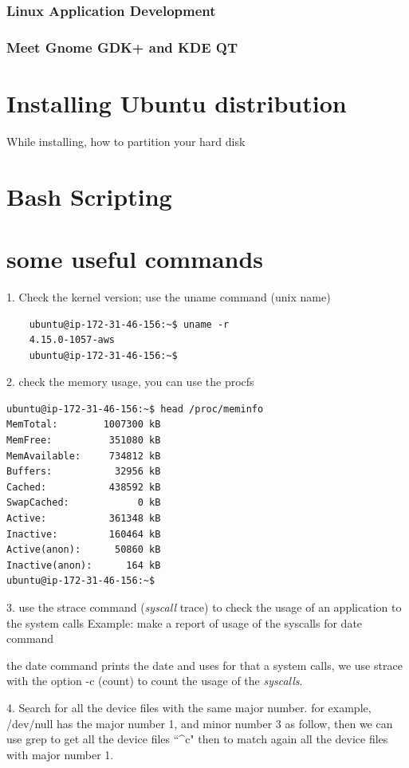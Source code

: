 \documentclass{article}
\begin{document}
\subsubsection{Linux Application Development}

\subsubsection{Meet Gnome GDK+ and KDE QT}

\section{Installing Ubuntu distribution}
While installing, how to partition your hard disk

\section{Bash Scripting}


\section{some useful commands}
1. Check the kernel version; use the uname command (unix name)
\begin{lstlisting}
    ubuntu@ip-172-31-46-156:~$ uname -r
    4.15.0-1057-aws
    ubuntu@ip-172-31-46-156:~$    
\end{lstlisting}

2. check the memory usage, you can use the procfs
\begin{lstlisting}
ubuntu@ip-172-31-46-156:~$ head /proc/meminfo
MemTotal:        1007300 kB
MemFree:          351080 kB
MemAvailable:     734812 kB
Buffers:           32956 kB
Cached:           438592 kB
SwapCached:            0 kB
Active:           361348 kB
Inactive:         160464 kB
Active(anon):      50860 kB
Inactive(anon):      164 kB
ubuntu@ip-172-31-46-156:~$
\end{lstlisting}

3. use the strace command (\textit{syscall} trace) to check the usage of an application to the system calls
Example: make a report of usage of the syscalls for date command 


the date command prints the date and uses for that a system calls, we use strace with the option -c (count) to count the usage of the \textit{syscalls}.

4. Search for all the device files with the same major number.
for example, /dev/null has the major number 1, and minor number 3 as follow, then we can use grep to get all the device files ``\textasciicircum c" then to match again all the device files with major number 1.

\end{document}
